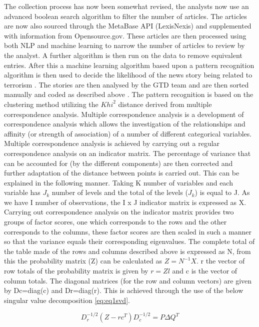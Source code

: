 The collection process has now been somewhat revised, the analysts now use an advanced boolean search algorithm to filter the number of articles. The articles are now also sourced through the MetaBase API (LexisNexis) and supplemented with information from Opensource.gov. These articles are then processed using both NLP and machine learning to narrow the number of articles to review by the analyst. A further algorithm is then run on the data to remove equivalent entries. After this a machine learning algorithm  based upon a pattern recognition algorithm is then used to decide the likelihood of the news story being related to terrorism \citep{fivethirtyeightGTD2015}. The stories are then analysed by the GTD team and are then sorted manually and coded as described above \citep{ben2016pattern}. The pattern recognition is based on the clustering method utilizing the ${Khi}^2$ distance derived from multiple correspondence analysis. Multiple correspondence analysis is a development of correspondence analysis which allows the investigation of the relationships and affinity (or strength of association) of a number of different categorical variables. Multiple correspondence analysis is achieved by carrying out a regular correspondence analysis on an indicator matrix. The percentage of variance that can be accounted for (by the different components) are then corrected and further adaptation of the distance between points is carried out. This can be explained in the following manner. Taking K number of variables and each variable has $J_{k}$ number of levels and the total of the levels ($J_{k}$) is equal to J. As we have I number of  observations, the I x J indicator matrix is expressed as X. Carrying out correspondence analysis on the indicator matrix provides two groups of factor scores, one which corresponds to the rows and the other corresponds to the columns, these factor scores are then scaled in such a manner so that the variance equals their corresponding eigenvalues. The complete total of the table made of the rows and columns described above is expressed as N, from this the probability matrix (Z) can be calculated as  $Z = N^{-1}X$. r the vector of row totals of the probability matrix is given by $r=Zl$ and c is the vector of column totals. The diagonal  matrices (for the row and column vectors) are given by Dc=diag(c) and Dr=diag(r). This is achieved through the use of the below singular value decomposition \ref{eq:eq1svd}. 

\begin{equation} D_{r}^{-1/2}(Z-rc^{T})D_{c}^{-1/2}=P\Delta Q^{T}  \label{eq:eq1svd} \end{equation}

